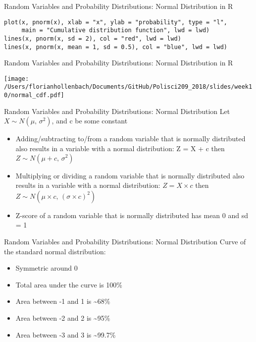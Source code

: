 \documentclass[presentation]{beamer}
\begin{document}
\begin{frame}[fragile,shrink=30,label={sec:org930c8fd}]{Random Variables and Probability Distributions: Normal Distribution in R}
 \begin{verbatim}
plot(x, pnorm(x), xlab = "x", ylab = "probability", type = "l",
     main = "Cumulative distribution function", lwd = lwd)
lines(x, pnorm(x, sd = 2), col = "red", lwd = lwd)
lines(x, pnorm(x, mean = 1, sd = 0.5), col = "blue", lwd = lwd)
\end{verbatim}
\end{frame}


\begin{frame}[label={sec:orgd32f8df}]{Random Variables and Probability Distributions: Normal Distribution in R}
\begin{center}
\texttt{[image: /Users/florianhollenbach/Documents/GitHub/Polisci209\_2018/slides/week10/normal\_cdf.pdf]}
\end{center}
\end{frame}


\begin{frame}[label={sec:org50605c2}]{Random Variables and Probability Distributions: Normal Distribution}
Let \(X \sim N(\mu,\,\sigma^{2})\), and c be some constant

\begin{itemize}
\item Adding/subtracting to/from a random variable that is normally distributed also results in a variable with a normal distribution:
Z = X + c then \(Z \sim N(\mu +c,\,\sigma^{2})\)
\end{itemize}

\pause


\begin{itemize}
\item Multiplying or dividing a random variable that is normally distributed also results in a variable with a normal distribution:
\(Z = X\times c\) then \(Z  \sim N(\mu \times c,\,(\sigma \times c)^{2})\)

\item Z-score of a random variable that is normally distributed has mean 0 and sd = 1
\end{itemize}
\end{frame}


\begin{frame}[label={sec:org32126a2}]{Random Variables and Probability Distributions: Normal Distribution}
Curve of the standard normal distribution:

\begin{itemize}
\item Symmetric around 0
\item Total area under the curve is 100\%
\item Area between -1 and 1 is \textasciitilde{}68\%
\item Area between -2 and 2 is \textasciitilde{}95\%
\item Area between -3 and 3 is \textasciitilde{}99.7\%
\end{itemize}
\end{frame}
\end{document}
